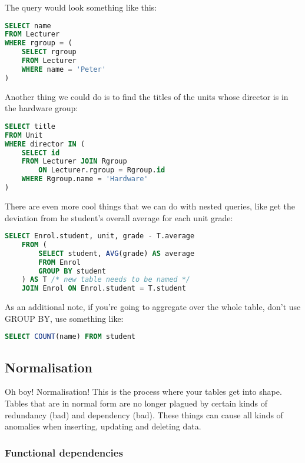\documentclass[11pt,a4paper,titlepage,dvipsnames,cmyk]{scrartcl}
\begin{document}
The query would look something like this:

\begin{lstlisting}[language=SQL]
SELECT name
FROM Lecturer
WHERE rgroup = (
    SELECT rgroup
    FROM Lecturer
    WHERE name = 'Peter'
)
\end{lstlisting}

Another thing we could do is to find the titles of the units whose
director is in the hardware group:

\begin{lstlisting}[language=SQL]
SELECT title
FROM Unit
WHERE director IN (
    SELECT id
    FROM Lecturer JOIN Rgroup
        ON Lecturer.rgroup = Rgroup.id
    WHERE Rgroup.name = 'Hardware'
)
\end{lstlisting}

There are even more cool things that we can do with nested queries, like
get the deviation from he student's overall average for each unit grade:

\begin{lstlisting}[language=SQL]
SELECT Enrol.student, unit, grade - T.average
    FROM (
        SELECT student, AVG(grade) AS average
        FROM Enrol
        GROUP BY student
    ) AS T /* new table needs to be named */
    JOIN Enrol ON Enrol.student = T.student
\end{lstlisting}

As an additional note, if you're going to aggregate over the whole table,
don't use GROUP BY, use something like:

\begin{lstlisting}[language=SQL]
SELECT COUNT(name) FROM student
\end{lstlisting}

\subsection{Normalisation}%
\label{sub:Normalisation}
Oh boy! Normalisation! This is the process where your tables get into
shape. Tables that are in normal form are no longer plagued by certain
kinds of redundancy (bad) and dependency (bad). These things can cause all
kinds of anomalies when inserting, updating and deleting data.

\subsubsection{Functional dependencies}%
\label{ssub:functional-dependencies}
\end{document}
